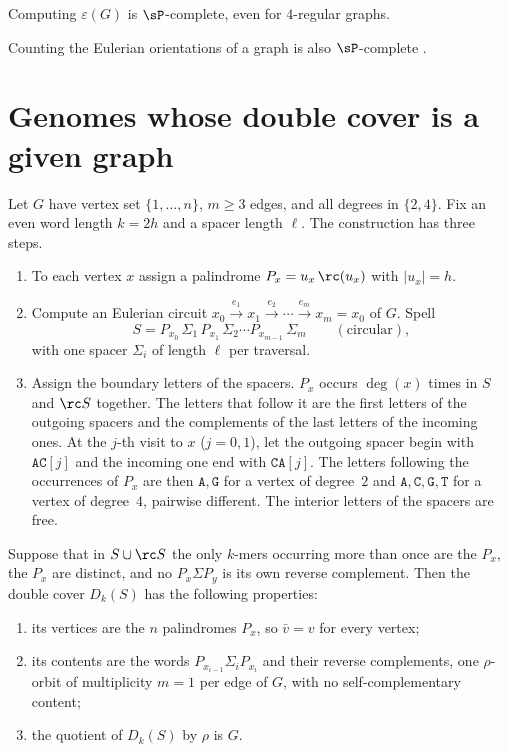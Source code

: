 \begin{theorem}[\cite{BW,GS12}]\label{ch10:thm:sharpP}
Computing $\varepsilon(G)$ is $\sP$-complete, even for $4$-regular graphs.
\end{theorem}

Counting the Eulerian orientations of a graph is also $\sP$-complete \cite{MW96}.

\section{Genomes whose double cover is a given graph}\label{ch10:sec:real}

Let $G$ have vertex set $\{1,\dots,n\}$, $m\ge3$ edges, and all degrees in $\{2,4\}$. Fix an even word length
$k=2h$ and a spacer length $\ell$. The construction has three steps.
\begin{enumerate}
\item To each vertex $x$ assign a palindrome $P_x=u_x\,\rc(u_x)$ with $|u_x|=h$.
\item Compute an Eulerian circuit $x_0\xrightarrow{e_1}x_1\xrightarrow{e_2}\cdots\xrightarrow{e_m}x_m=x_0$ of $G$.
Spell
\[
S=P_{x_0}\,\Sigma_1\,P_{x_1}\,\Sigma_2\cdots P_{x_{m-1}}\,\Sigma_m\qquad(\text{circular}),
\]
with one spacer $\Sigma_i$ of length $\ell$ per traversal.
\item Assign the boundary letters of the spacers. $P_x$ occurs $\deg(x)$ times in $S$ and $\rc S$
together. The letters that follow it are the first letters of the outgoing spacers and the complements
of the last letters of the incoming ones. At the $j$-th visit to $x$ ($j=0,1$), let the outgoing spacer
begin with $\mathtt{AC}[j]$ and the incoming one end with $\mathtt{CA}[j]$. The letters following the
occurrences of $P_x$ are then $\mathtt A,\mathtt G$ for a vertex of degree~$2$ and
$\mathtt A,\mathtt C,\mathtt G,\mathtt T$ for a vertex of degree~$4$, pairwise different. The interior
letters of the spacers are free.
\end{enumerate}

\begin{lemma}[realization]\label{ch10:lem:real}
Suppose that in $S\cup\rc S$ the only $k$-mers occurring more than once are the $P_x$, the $P_x$ are
distinct, and no $P_x\Sigma P_y$ is its own reverse complement. Then the double cover $D_k(S)$ has the
following properties:
\begin{enumerate}
\item its vertices are the $n$ palindromes $P_x$, so $\bar v=v$ for every vertex;
\item its contents are the words $P_{x_{i-1}}\Sigma_iP_{x_i}$ and their reverse complements, one
$\rho$-orbit of multiplicity $m=1$ per edge of $G$, with no self-complementary content;
\item the quotient of $D_k(S)$ by $\rho$ is $G$.
\end{enumerate}
\end{lemma}

